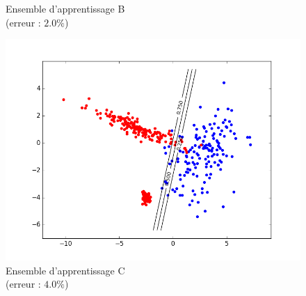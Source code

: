 \documentclass[paper=a4, fontsize=11pt]{article}
\begin{document}
\begin{figure}[h]
\begin{minipage}[b]{.3\linewidth}
  \caption*{Ensemble d'apprentissage B \\ (erreur : $2.0\%$)}
 \end{minipage} \hfill
 \begin{minipage}[b]{.3\linewidth}
  \includegraphics[scale=0.25]{figures/LDA_C_train.png}
  \caption*{Ensemble d'apprentissage C \\ (erreur : $4.0\%$)}
 \end{minipage}
\end{figure}
\end{document}

